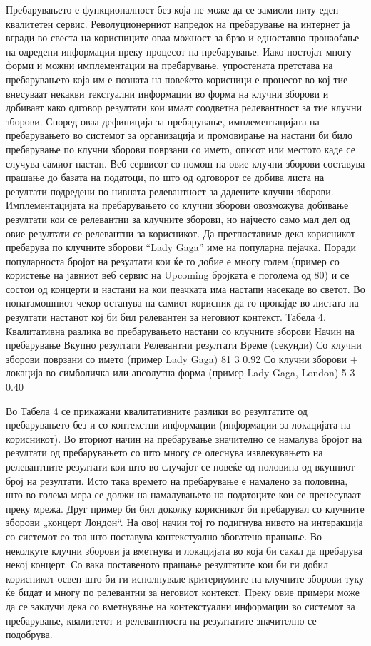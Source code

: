 Пребарувањето е функционалност без која не може да
се замисли ниту еден квалитетен сервис. Револуционерниот напредок на пребарување
на интернет ја вгради во свеста на корисниците оваа можност за брзо и едноставно
пронаоѓање на одредени информации преку процесот на пребарување. Иако постојат
многу форми и можни имплементации на пребарување, упростената претстава на
пребарувањето која им е позната на повеќето корисници е процесот во кој тие
внесуваат некакви текстуални информации во форма на клучни зборови и добиваат
како одговор резултати кои имаат соодветна релевантност за тие клучни зборови.
Според оваа дефиниција за пребарување, имплементацијата на пребарувањето во
системот за организација и промовирање на настани би било пребарување по клучни
зборови поврзани со името, описот или местото каде се случува самиот настан.
Веб-сервисот со помош на овие клучни зборови составува прашање до базата на
податоци, по што од одговорот се добива листа на резултати подредени по нивната
релевантност за дадените клучни зборови. Имплементацијата на пребарувањето со
клучни зборови овозможува добивање резултати кои се релевантни за клучните
зборови, но најчесто само мал дел од овие резултати се релевантни за корисникот.
Да претпоставиме дека корисникот пребарува по клучните зборови “Lady Gaga” име
на популарна пејачка. Поради популарноста бројот на резултати кои ќе го добие е
многу голем (пример со користење на јавниот веб сервис на Upcoming бројката е
поголема од 80) и се состои од концерти и настани на кои пеачката има настапи
насекаде во светот. Во понатамошниот чекор останува на самиот корисник да го
пронајде во листата на резултати настанот кој би бил релевантен за неговиот
контекст. Табела 4. Квалитативна разлика во пребарувањето настани со клучните
зборови Начин на пребарување    Вкупно резултати    Релевантни резултати   
Време (секунди) Со клучни зборови поврзани со името (пример Lady Gaga)  81  3  
0.92 Со клучни зборови + локација во симболичка или апсолутна форма (пример Lady
Gaga, London)   5   3   0.40

Во Табела 4 се прикажани квалитативните разлики во резултатите од пребарувањето
без и со контекстни информации (информации за локацијата на корисникот). Во
вториот начин на пребарување значително се намалува бројот на резултати од
пребарувањето со што многу се олеснува извлекувањето на релевантните резултати
кои што во случајот се повеќе од половина од вкупниот број на резултати. Исто
така времето на пребарување е намалено за половина, што во голема мера се должи
на намалувањето на податоците кои се пренесуваат преку мрежа. Друг пример би бил
доколку корисникот би пребарувал со клучните зборови „концерт Лондон“. На овој
начин тој го подигнува нивото на интеракција со системот со тоа што поставува
контекстуално збогатено прашање. Во неколкуте клучни зборови ја вметнува и
локацијата во која би сакал да пребарува некој концерт. Со вака поставеното
прашање резултатите кои би ги добил корисникот освен што би ги исполнувале
критериумите на клучните зборови туку ќе бидат и многу по релевантни за неговиот
контекст. Преку овие примери може да се заклучи дека со вметнување на
контекстуални информации во системот за пребарување, квалитетот и релевантноста
на резултатите значително се подобрува.
 
